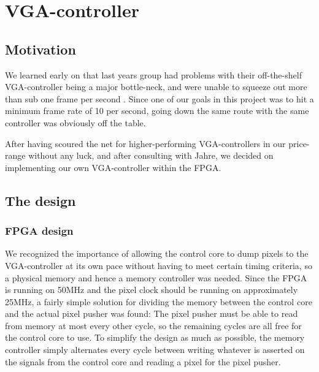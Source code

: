 \section{VGA-controller}


\subsection{Motivation}
 We learned early on that last years
group had problems with their off-the-shelf VGA-controller being a major
bottle-neck, and were unable to squeeze out more than sub one frame per second
. Since one of our goals  in this project was
to hit a minimum frame rate of 10 per second, going down the same route with the
same controller was obviously off the table.

After having scoured the net for higher-performing VGA-controllers in our
price-range without any luck, and after consulting with Jahre, we decided on
implementing our own VGA-controller within the FPGA.

\subsection{The design}



\subsubsection{FPGA design}

We recognized the importance of allowing the control core to dump pixels to the
VGA-controller at its own pace without having to meet certain timing criteria,
so a physical memory and hence a memory controller was needed.  Since the FPGA
is running on 50MHz and the pixel clock should be running on approximately
25MHz, a fairly simple solution for dividing the memory between the control core
and the actual pixel pusher was found: The pixel
pusher must be able to read from memory at most every other cycle, so the
remaining cycles are all free for the control core to use.  To simplify the
design as much as possible, the memory controller simply alternates every cycle
between writing whatever is asserted on the signals from the control core and
reading a pixel for the pixel pusher.

